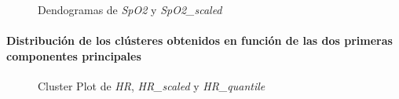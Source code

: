 \begin{figure}[ht]
    \centering
    \hfill
    \caption{Dendogramas de \textit{SpO2} y \textit{SpO2\_scaled}}\label{fig:acf_den_spo2}
\end{figure}

\paragraph{Distribución de los clústeres obtenidos en función de las dos primeras componentes principales}

\begin{figure}[H]
    \centering
    \caption{Cluster Plot de \textit{HR}, \textit{HR\_scaled} y \textit{HR\_quantile}}
    \label{fig:acf_pc_fc}
\end{figure}


